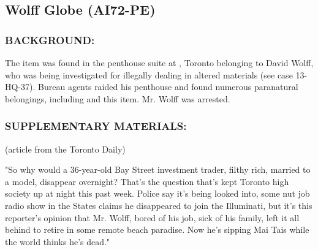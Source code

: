 \subsection*{Wolff Globe (AI72-PE)}
\subsubsection*{BACKGROUND:}
\par The item was found in the penthouse suite at , Toronto belonging to David Wolff, who was
being investigated for illegally dealing in altered materials (see
case 13-HQ-37). Bureau agents raided his penthouse and found
numerous paranatural belongings, including  
and this item. Mr. Wolff was arrested.
\subsubsection*{SUPPLEMENTARY MATERIALS:}
\par (article from the Toronto Daily)
\par "So why would a 36-year-old Bay Street investment trader, filthy
rich, married to a model, disappear overnight? That's the question
that's kept Toronto high society up at night this past week. Police
say it's being looked into, some nut job radio show in the States
claims he disappeared to join the Illuminati, but it's this reporter's
opinion that Mr. Wolff, bored of his job, sick of his family, left it all
behind to retire in some remote beach paradise. Now he's sipping
Mai Tais while the world thinks he's dead."